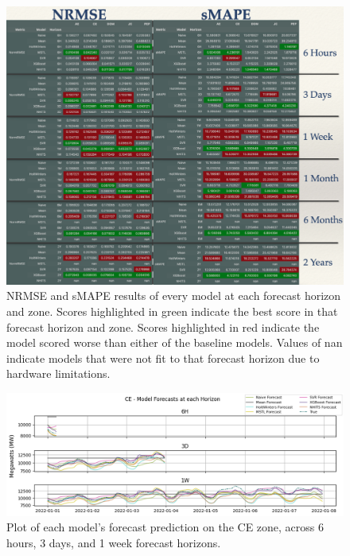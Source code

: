 \documentclass[sigconf]{acmart}
\begin{document}
  \begin{figure}[hbt!]
    \includegraphics[width=\textwidth]{Images/Results_Composed.png}
    \caption{NRMSE and sMAPE results of every model at each forecast horizon and zone. Scores highlighted in green indicate the best score in that forecast horizon and zone. Scores highlighted in red indicate the model scored worse than either of the baseline models. Values of nan indicate models that were not fit to that forecast horizon due to hardware limitations.}
    \Description{}
    \label{fig:results}
  \end{figure}
  
  \begin{figure}[hbt!]
    \includegraphics[width=\textwidth]{Images/Result_Plot_1.png}
    \caption{Plot of each model's forecast prediction on the CE zone, across 6 hours, 3 days, and 1 week forecast horizons.}
    \Description{}
    \label{fig:resultsplot2}
  \end{figure}
  
\end{document}
